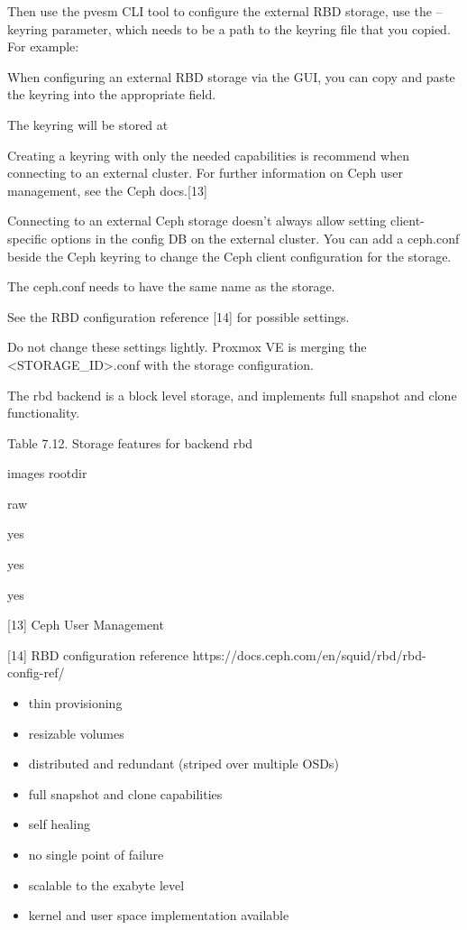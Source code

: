 Then use the pvesm CLI tool to configure the external RBD storage, use the --keyring parameter, which needs to be a path to the keyring file that you copied. For example:

When configuring an external RBD storage via the GUI, you can copy and paste the keyring into the appropriate field.

The keyring will be stored at

Creating a keyring with only the needed capabilities is recommend when connecting to an external cluster. For further information on Ceph user management, see the Ceph docs.[13]

Connecting to an external Ceph storage doesn’t always allow setting client-specific options in the config DB on the external cluster. You can add a ceph.conf beside the Ceph keyring to change the Ceph client configuration for the storage.

The ceph.conf needs to have the same name as the storage.

See the RBD configuration reference [14] for possible settings.

Do not change these settings lightly. Proxmox VE is merging the <STORAGE_ID>.conf with the storage configuration.

The rbd backend is a block level storage, and implements full snapshot and clone functionality.

Table 7.12. Storage features for backend rbd

images rootdir

raw

yes

yes

yes

[13] Ceph User Management

[14] RBD configuration reference https://docs.ceph.com/en/squid/rbd/rbd-config-ref/

\begin{itemize}[leftmargin=2cm]

	\item thin provisioning

	\item resizable volumes

	\item distributed and redundant (striped over multiple OSDs)

	\item full snapshot and clone capabilities

	\item self healing

	\item no single point of failure

	\item scalable to the exabyte level

	\item kernel and user space implementation available

\end{itemize}

